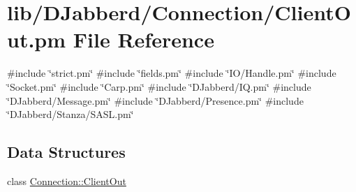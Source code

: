 \hypertarget{_connection_2_client_out_8pm}{
\section{lib/\-D\-Jabberd/\-Connection/\-Client\-Out.pm \-File \-Reference}
\label{_connection_2_client_out_8pm}
}
{\ttfamily \#include \char`\"{}strict.\-pm\char`\"{}}\*
{\ttfamily \#include \char`\"{}fields.\-pm\char`\"{}}\*
{\ttfamily \#include \char`\"{}\-I\-O/\-Handle.\-pm\char`\"{}}\*
{\ttfamily \#include \char`\"{}\-Socket.\-pm\char`\"{}}\*
{\ttfamily \#include \char`\"{}\-Carp.\-pm\char`\"{}}\*
{\ttfamily \#include \char`\"{}\-D\-Jabberd/\-I\-Q.\-pm\char`\"{}}\*
{\ttfamily \#include \char`\"{}\-D\-Jabberd/\-Message.\-pm\char`\"{}}\*
{\ttfamily \#include \char`\"{}\-D\-Jabberd/\-Presence.\-pm\char`\"{}}\*
{\ttfamily \#include \char`\"{}\-D\-Jabberd/\-Stanza/\-S\-A\-S\-L.\-pm\char`\"{}}\*
\subsection*{\-Data \-Structures}
\begin{DoxyCompactItemize}
\item 
class \hyperlink{class_d_jabberd_1_1_connection_1_1_client_out}{\-Connection\-::\-Client\-Out}
\end{DoxyCompactItemize}
